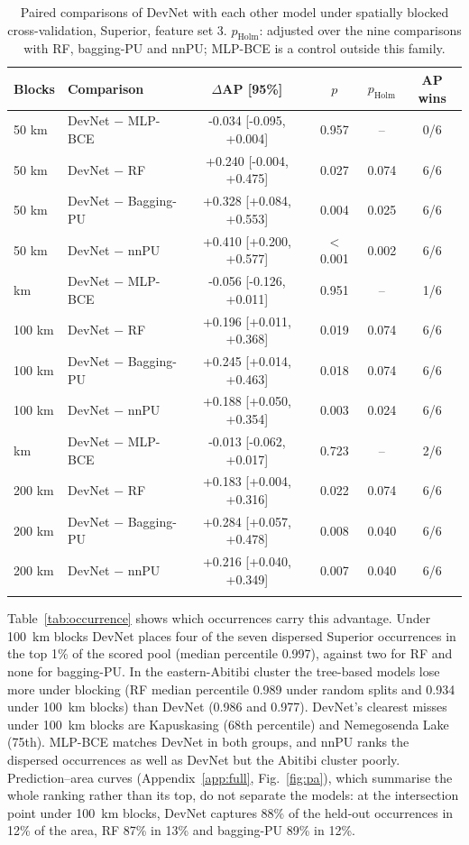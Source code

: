 \documentclass[pdflatex,sn-apa]{sn-jnl}
\begin{document}
\begin{table}[t]
\caption{Paired comparisons of DevNet with each other model under spatially blocked cross-validation, Superior, feature set 3. $p_{\mathrm{Holm}}$: adjusted over the nine comparisons with RF, bagging-PU and nnPU; MLP-BCE is a control outside this family.}\label{tab:spatial-boot}
\footnotesize
\begin{tabular*}{\textwidth}{@{\extracolsep\fill}llcccc}
\toprule
Blocks & Comparison & $\Delta$AP [95\%] & $p$ & $p_{\mathrm{Holm}}$ & AP wins \\
\midrule
50 km & DevNet $-$ MLP-BCE & -0.034 [-0.095, +0.004] & 0.957 & -- & 0/6 \\
50 km & DevNet $-$ RF & +0.240 [-0.004, +0.475] & 0.027 & 0.074 & 6/6 \\
50 km & DevNet $-$ Bagging-PU & +0.328 [+0.084, +0.553] & 0.004 & 0.025 & 6/6 \\
50 km & DevNet $-$ nnPU & +0.410 [+0.200, +0.577] & $<$0.001 & 0.002 & 6/6 \\
\addlinespace
100 km & DevNet $-$ MLP-BCE & -0.056 [-0.126, +0.011] & 0.951 & -- & 1/6 \\
100 km & DevNet $-$ RF & +0.196 [+0.011, +0.368] & 0.019 & 0.074 & 6/6 \\
100 km & DevNet $-$ Bagging-PU & +0.245 [+0.014, +0.463] & 0.018 & 0.074 & 6/6 \\
100 km & DevNet $-$ nnPU & +0.188 [+0.050, +0.354] & 0.003 & 0.024 & 6/6 \\
\addlinespace
200 km & DevNet $-$ MLP-BCE & -0.013 [-0.062, +0.017] & 0.723 & -- & 2/6 \\
200 km & DevNet $-$ RF & +0.183 [+0.004, +0.316] & 0.022 & 0.074 & 6/6 \\
200 km & DevNet $-$ Bagging-PU & +0.284 [+0.057, +0.478] & 0.008 & 0.040 & 6/6 \\
200 km & DevNet $-$ nnPU & +0.216 [+0.040, +0.349] & 0.007 & 0.040 & 6/6 \\
\botrule
\end{tabular*}
\end{table}

Table~\ref{tab:occurrence} shows which occurrences carry this advantage. Under 100~km blocks DevNet places four of the seven dispersed Superior occurrences in the top 1\% of the scored pool (median percentile 0.997), against two for RF and none for bagging-PU. In the eastern-Abitibi cluster the tree-based models lose more under blocking (RF median percentile 0.989 under random splits and 0.934 under 100~km blocks) than DevNet (0.986 and 0.977). DevNet's clearest misses under 100~km blocks are Kapuskasing (68th percentile) and Nemegosenda Lake (75th). MLP-BCE matches DevNet in both groups, and nnPU ranks the dispersed occurrences as well as DevNet but the Abitibi cluster poorly. Prediction--area curves (Appendix~\ref{app:full}, Fig.~\ref{fig:pa}), which summarise the whole ranking rather than its top, do not separate the models: at the intersection point under 100~km blocks, DevNet captures 88\% of the held-out occurrences in 12\% of the area, RF 87\% in 13\% and bagging-PU 89\% in 12\%.
\end{document}
